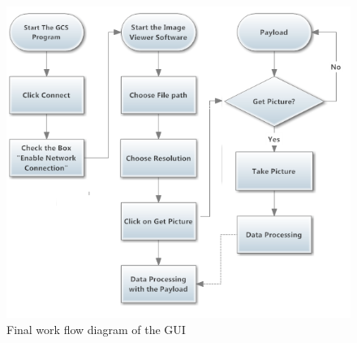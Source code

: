 \begin{figure}[H]
\begin{center}
\includegraphics[scale=1]{figures/finalWorkFlow.png} 
\end{center}
\caption{Final work flow diagram of the GUI\label{GUI_finalWorkFlow}}
\end{figure}
